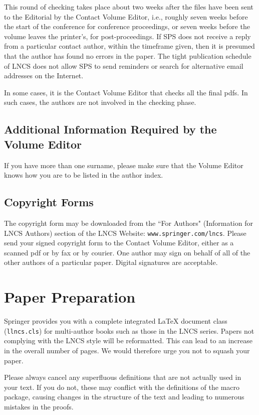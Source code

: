 \documentclass{book}
\begin{document}
This round of checking takes place about two weeks after the files have
been sent to the Editorial by the Contact Volume Editor, i.e., roughly
seven weeks before the start of the conference for conference
proceedings, or seven weeks before the volume leaves the printer's, for
post-proceedings. If SPS does not receive a reply from a particular
contact author, within the timeframe given, then it is presumed that the
author has found no errors in the paper. The tight publication schedule
of LNCS does not allow SPS to send reminders or search for alternative
email addresses on the Internet.

In some cases, it is the Contact Volume Editor that checks all the final
pdfs. In such cases, the authors are not involved in the checking phase.

\subsection{Additional Information Required by the Volume Editor}

If you have more than one surname, please make sure that the Volume Editor
knows how you are to be listed in the author index.

\subsection{Copyright Forms}

The copyright form may be downloaded from the ``For Authors"
(Information for LNCS Authors) section of the LNCS Website:
\texttt{www.springer.com/lncs}. Please send your signed copyright form
to the Contact Volume Editor, either as a scanned pdf or by fax or by
courier. One author may sign on behalf of all of the other authors of a
particular paper. Digital signatures are acceptable.

\section{Paper Preparation}

Springer provides you with a complete integrated \LaTeX{} document class
(\texttt{llncs.cls}) for multi-author books such as those in the LNCS
series. Papers not complying with the LNCS style will be reformatted.
This can lead to an increase in the overall number of pages. We would
therefore urge you not to squash your paper.

Please always cancel any superfluous definitions that are
not actually used in your text. If you do not, these may conflict with
the definitions of the macro package, causing changes in the structure
of the text and leading to numerous mistakes in the proofs.
\end{document}
